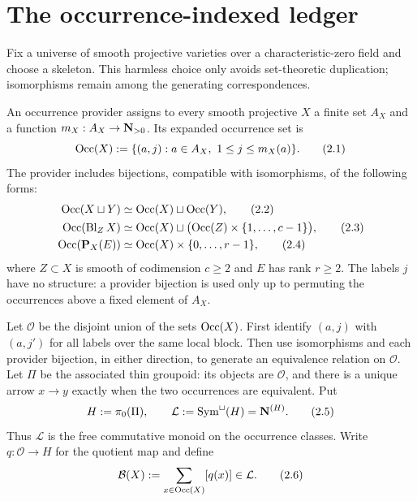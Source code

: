 \section{The occurrence-indexed ledger}
\label{sec:ledger}

Fix a universe of smooth projective varieties over a characteristic-zero
field and choose a skeleton.  This harmless choice only avoids set-theoretic
duplication; isomorphisms remain among the generating correspondences.

\begin{definition}
\label{def:provider}
An occurrence provider assigns to every smooth projective $X$ a finite set
$A_X$ and a function $m_X:A_X\to\mathbf N_{>0}$.  Its expanded occurrence set is
\[
 \operatorname{Occ}(X):=\{(a,j):a\in A_X,\ 1\le j\le m_X(a)\}.
 \tag{2.1}
\]
The provider includes bijections, compatible with isomorphisms, of the
following forms:
\begin{align}
 \operatorname{Occ}(X\sqcup Y)&\simeq \operatorname{Occ}(X)\sqcup\operatorname{Occ}(Y),
                                                        \tag{2.2}\label{eq:disjoint}\\
 \operatorname{Occ}(\operatorname{Bl}_ZX)&\simeq
   \operatorname{Occ}(X)\sqcup\bigl(\operatorname{Occ}(Z)\times\{1,\ldots,c-1\}\bigr),
                                                        \tag{2.3}\label{eq:blowup}\\
 \operatorname{Occ}(\mathbf P_X(E))&\simeq
   \operatorname{Occ}(X)\times\{0,\ldots,r-1\},
                                                        \tag{2.4}\label{eq:projective}
\end{align}
where $Z\subset X$ is smooth of codimension $c\ge2$ and $E$ has rank
$r\ge2$.
The labels $j$ have no structure: a provider bijection is used only up to
permuting the occurrences above a fixed element of $A_X$.
\end{definition}

Let \(\mathscr O\) be the disjoint union of the sets \(\operatorname{Occ}(X)\).  First
identify $(a,j)$ with $(a,j')$ for all labels over the same local block.
Then use isomorphisms and each provider bijection, in either direction, to
generate an equivalence relation on \(\mathscr O\).  Let
\(\Pi\) be the associated thin groupoid: its objects are \(\mathscr O\), and
there is a unique arrow $x\to y$ exactly when the two occurrences are
equivalent.  Put
\[
 H:=\pi_0(\Pi),
 \qquad
 \mathcal L:=\operatorname{Sym}^{\sqcup}(H)=\mathbf N^{(H)}.
 \tag{2.5}\label{eq:ledger}
\]
Thus \(\mathcal L\) is the free commutative monoid on the occurrence classes.
Write $q:\mathscr O\to H$ for the quotient map and define
\[
 \mathcal B(X):=\sum_{x\in\operatorname{Occ}(X)}[q(x)]\in\mathcal L.
 \tag{2.6}\label{eq:block-ledger}
\]

